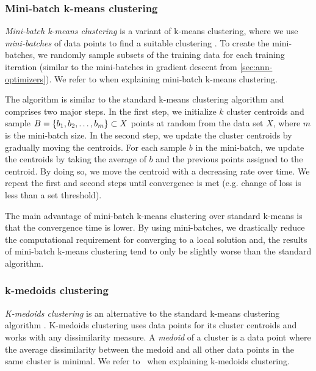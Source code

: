 \subsubsection{Mini-batch k-means clustering}
\label{sec:mini-batch-k-means-clustering}
\textit{Mini-batch k-means clustering} is a variant of k-means clustering, where we use \textit{mini-batches} of data points to find a suitable clustering \cite{sculley2010}. To create the mini-batches, we randomly sample subsets of the training data for each training iteration (similar to the mini-batches in gradient descent from \cref{sec:ann-optimizers}). We refer to \cite{sculley2010} when explaining mini-batch k-means clustering.

The algorithm is similar to the standard k-means clustering algorithm and comprises two major steps. In the first step, we initialize $k$ cluster centroids and sample $B=\left\{b_1, b_2, \ldots, b_m\right\} \subset X$ points at random from the data set $X$, where $m$ is the mini-batch size. In the second step, we update the cluster centroids by gradually moving the centroids. For each sample $b$ in the mini-batch, we update the centroids by taking the average of $b$ and the previous points assigned to the centroid. By doing so, we move the centroid with a decreasing rate over time. We repeat the first and second steps until convergence is met (e.g. change of loss is less than a set threshold).

The main advantage of mini-batch k-means clustering over standard k-means is that the convergence time is lower. By using mini-batches, we drastically reduce the computational requirement for converging to a local solution and, the results of mini-batch k-means clustering tend to only be slightly worse than the standard algorithm.

\subsubsection{k-medoids clustering}
\label{sec:k-medoids-clustering}
\textit{K-medoids clustering} is an alternative to the standard k-means clustering algorithm \cites{Kaufman1990}[p. 427 - 428]{bishop2006}. K-medoids clustering uses data points for its cluster centroids and works with any dissimilarity measure. A \textit{medoid} of a cluster is a data point where the average dissimilarity between the medoid and all other data points in the same cluster is minimal. We refer to \cites{Kaufman1990}[p. 427 - 428]{bishop2006}\, when explaining k-medoids clustering.

